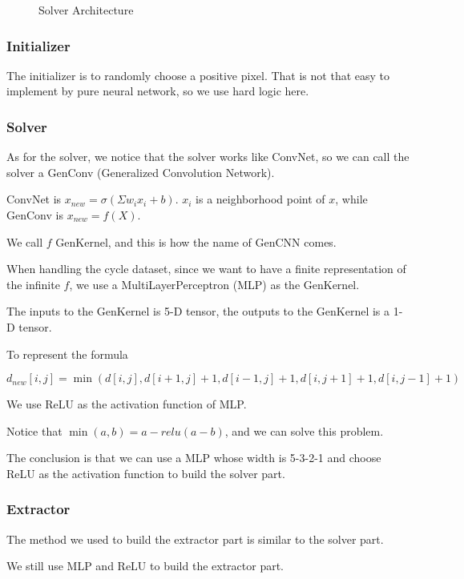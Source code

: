 \documentclass{article}
\begin{document}
\begin{figure}[H]
\begin{minipage}{.5\textwidth}
    \caption{Solver Architecture}
    \label{fig:fig2}
\end{minipage}
\end{figure}

\subsubsection{Initializer}

The initializer is to randomly choose a positive pixel. That is not that easy to implement by pure neural network, so we use hard logic here.

\subsubsection{Solver}

As for the solver, we notice that the solver works like ConvNet, so we can call the solver a GenConv (Generalized Convolution Network).

ConvNet is $x_{new} = \sigma(\Sigma w_ix_i + b)$. $x_i$ is a neighborhood point of $x$, while GenConv is $x_{new} = f(X)$.

We call $f$ GenKernel, and this is how the name of GenCNN comes.

When handling the cycle dataset, since we want to have a finite representation of the infinite $f$, 
we use a MultiLayerPerceptron (MLP) as the GenKernel.

The inputs to the GenKernel is 5-D tensor, the outputs to the GenKernel is a 1-D tensor.

To represent the formula

$$d_{new}[i,j] = \min(d[i,j], d[i+1, j] + 1, d[i-1, j] + 1, d[i, j+1] + 1, d[i, j-1] + 1)$$

We use ReLU as the activation function of MLP.

Notice that $\min(a, b) = a - relu(a - b)$, and we can solve this problem.

The conclusion is that we can use a MLP whose width is 5-3-2-1 and choose ReLU as the activation function to build the solver part.

\subsubsection{Extractor}

The method we used to build the extractor part is similar to the solver part.

We still use MLP and ReLU to build the extractor part.
\end{document}
